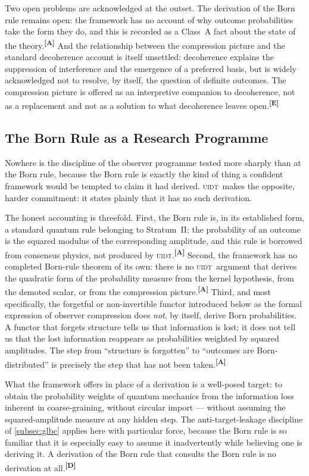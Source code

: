 \documentclass[12pt,a4paper,twoside]{article}
\theoremstyle{plain}
\theoremstyle{definition}
\theoremstyle{remark}
\newcommand{\UIDT}{\textsc{uidt}}
\newcommand{\catmark}[1]{\textsuperscript{\textsf{\textbf{[#1]}}}}
\begin{document}
Two open problems are acknowledged at the outset. The derivation of the
Born rule remains open: the framework has no account of why outcome
probabilities take the form they do, and this is recorded as a Class~A
fact about the state of the theory.\catmark{A} And the relationship
between the compression picture and the standard decoherence account is
itself unsettled: decoherence explains the suppression of interference
and the emergence of a preferred basis, but is widely acknowledged not
to resolve, by itself, the question of definite outcomes. The
compression picture is offered as an interpretive companion to
decoherence, not as a replacement and not as a solution to what
decoherence leaves open.\catmark{E}

\subsection{The Born Rule as a Research Programme}
\label{subsec:born-rule}

Nowhere is the discipline of the observer programme tested more sharply
than at the Born rule, because the Born rule is exactly the kind of
thing a confident framework would be tempted to claim it had derived.
\UIDT\ makes the opposite, harder commitment: it states plainly that it
has no such derivation.

The honest accounting is threefold. First, the Born rule is, in its
established form, a standard quantum rule belonging to Stratum~II; the
probability of an outcome is the squared modulus of the corresponding
amplitude, and this rule is borrowed from consensus physics, not
produced by \UIDT.\catmark{A} Second, the framework has no completed
Born-rule theorem of its own: there is no \UIDT\ argument that derives
the quadratic form of the probability measure from the kernel
hypothesis, from the demoted scalar, or from the compression
picture.\catmark{A} Third, and most specifically, the forgetful or
non-invertible functor introduced below as the formal expression of
observer compression does \emph{not}, by itself, derive Born
probabilities. A functor that forgets structure tells us that
information is lost; it does not tell us that the lost information
reappears as probabilities weighted by squared amplitudes. The step from
``structure is forgotten'' to ``outcomes are Born-distributed'' is
precisely the step that has not been taken.\catmark{A}

What the framework offers in place of a derivation is a well-posed
target: to obtain the probability weights of quantum mechanics from the
information loss inherent in coarse-graining, without circular import
--- without assuming the squared-amplitude measure at any hidden step.
The anti-target-leakage discipline of \cref{subsec:glbc} applies here
with particular force, because the Born rule is so familiar that it is
especially easy to assume it inadvertently while believing one is
deriving it. A derivation of the Born rule that consults the Born rule
is no derivation at all.\catmark{D}
\end{document}
